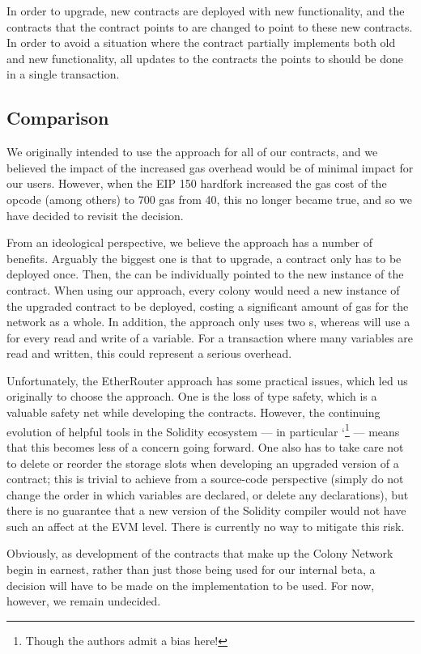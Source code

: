 In order to upgrade, new contracts are deployed with new functionality, and the contracts that the  contract points to are changed to point to these new contracts. In order to avoid a situation where the contract partially implements both old and new functionality, all updates to the contracts the  points to should be done in a single transaction.

\subsection{Comparison}

We originally intended to use the  approach for all of our contracts, and we believed the impact of the increased gas overhead would be of minimal impact for our users.  However, when the EIP 150 hardfork\cite{EIP150} increased the gas cost of the opcode  (among others) to 700 gas from 40, this no longer became true, and so we have decided to revisit the decision.

From an ideological perspective, we believe the  approach has a number of benefits. Arguably the biggest one is that to upgrade, a contract only has to be deployed once. Then, the  can be individually pointed to the new instance of the contract. When using our  approach, every colony would need a new instance of the upgraded contract to be deployed, costing a significant amount of gas for the network as a whole. In addition, the  approach only uses two s, whereas  will use a  for every read and write of a variable. For a transaction where many variables are read and written, this could represent a serious overhead.

Unfortunately, the EtherRouter approach has some practical issues, which led us originally to choose the   approach. One is the loss of type safety, which is a valuable safety net while developing the contracts. However, the continuing evolution of helpful tools in the Solidity ecosystem --- in particular `\footnote{Though the authors admit a bias here!} --- means that this becomes less of a concern going forward. One also has to take care not to delete or reorder the storage slots when developing an upgraded version of a contract; this is trivial to achieve from a source-code perspective (simply do not change the order in which variables are declared, or delete any declarations), but there is no guarantee that a new version of the Solidity compiler would not have such an affect at the EVM level. There is currently no way to mitigate this risk.

Obviously, as development of the contracts that make up the Colony Network begin in earnest, rather than just those being used for our internal beta, a decision will have to be made on the implementation to be used. For now, however, we remain undecided.